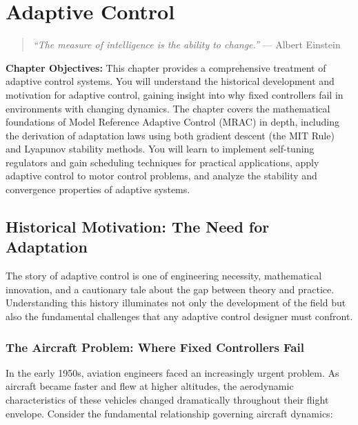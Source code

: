 
\chapter{Adaptive Control}
\label{chap:adaptive_control}

\begin{quote}
\textit{``The measure of intelligence is the ability to change.''} --- Albert Einstein
\end{quote}

\vspace{1em}

\noindent\textbf{Chapter Objectives:}
This chapter provides a comprehensive treatment of adaptive control systems. You will understand the historical development and motivation for adaptive control, gaining insight into why fixed controllers fail in environments with changing dynamics. The chapter covers the mathematical foundations of Model Reference Adaptive Control (MRAC) in depth, including the derivation of adaptation laws using both gradient descent (the MIT Rule) and Lyapunov stability methods. You will learn to implement self-tuning regulators and gain scheduling techniques for practical applications, apply adaptive control to motor control problems, and analyze the stability and convergence properties of adaptive systems.

\section{Historical Motivation: The Need for Adaptation}
\label{sec:adaptive_history}

The story of adaptive control is one of engineering necessity, mathematical innovation, and a cautionary tale about the gap between theory and practice. Understanding this history illuminates not only the development of the field but also the fundamental challenges that any adaptive control designer must confront.

\subsection{The Aircraft Problem: Where Fixed Controllers Fail}

In the early 1950s, aviation engineers faced an increasingly urgent problem. As aircraft became faster and flew at higher altitudes, the aerodynamic characteristics of these vehicles changed dramatically throughout their flight envelope. Consider the fundamental relationship governing aircraft dynamics:

